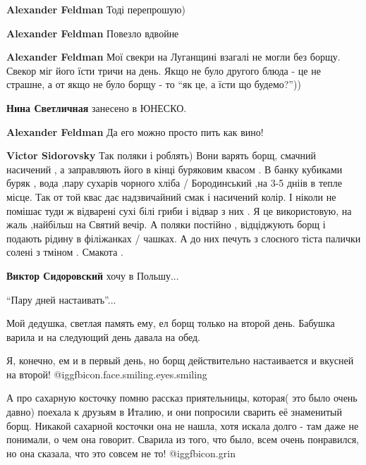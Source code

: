\begin{itemize}
\begin{itemize}
\begin{itemize}
\textbf{Alexander Feldman}
Тоді перепрошую)

\textbf{Alexander Feldman} Повезло вдвойне

\end{itemize} %

\textbf{Alexander Feldman} Мої свекри на Луганщині взагалі не могли без борщу. Свекор міг його їсти тричи на день. Якщо не було другого блюда - це не страшне, а от якщо не було борщу - то \enquote{як це, а їсти що будемо?}))

\textbf{Нина Светличная} занесено в ЮНЕСКО.

\textbf{Alexander Feldman} Да его можно просто пить как вино!

\begin{itemize} %
\textbf{Victor Sidorovsky}
\obeycr
Так поляки і роблять)
Вони варять борщ, смачний насичений , а заправляють його в кінці буряковим квасом .
В банку кубиками буряк , вода ,пару сухарів чорного хліба / Бородинський ,на 3-5 дніів в тепле місце.
Так от той квас дає надзвичайний смак і насичений колір.
І ніколи не помішає туди ж відварені сухі білі гриби і відвар з них .
Я це використовую, на жаль ,найбільш на Святий вечір.
А поляки постійно , відціджують борщ і подають рідину в філіжанках / чашках.
А до них печуть з слоєного тіста палички солені з тміном .
Смакота .
\restorecr

\textbf{Виктор Сидоровский} хочу в Польшу...

\end{itemize} %

\end{itemize} %


\enquote{Пару дней настаивать}...

Мой дедушка, светлая память ему, ел борщ только на второй день. Бабушка варила
и на следующий день давала на обед.

Я, конечно, ем и в первый день, но борщ действительно настаивается и вкусней на
второй! @igg{fbicon.face.smiling.eyes.smiling} 

А про сахарную косточку помню рассказ приятельницы, которая( это было очень
давно) поехала к друзьям в Италию, и они попросили сварить её знаменитый борщ.
Никакой сахарной косточки она не нашла, хотя искала долго - там даже не
понимали, о чем она говорит. Сварила из того, что было, всем очень понравился,
но она сказала, что это совсем не то! @igg{fbicon.grin} 



\end{itemize}
